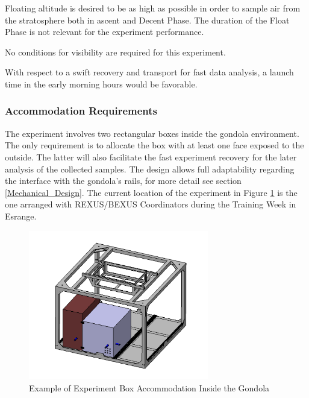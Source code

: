 Floating altitude is desired to be as high as possible in order to sample air from the stratosphere both in ascent and Decent Phase. The duration of the Float Phase is not relevant for the experiment performance. 

\smallskip
No conditions for visibility are required for this experiment.

\smallskip
With respect to a swift recovery and transport for fast data analysis, a launch time in the early morning hours would be favorable.

\pagebreak
\subsubsection{Accommodation Requirements}

The experiment involves two rectangular boxes inside the gondola environment. The only requirement is to allocate the box with at least one face exposed to the outside. The latter will also facilitate the fast experiment recovery for the later analysis of the collected samples. The design allows full adaptability regarding the interface with the gondola's rails, for more detail see section \ref{Mechanical_Design}. The current location of the experiment in Figure \ref{goldola_accommodation} is the one arranged with REXUS/BEXUS Coordinators during the Training Week in Esrange.

\begin{figure}[!ht]
    \centering
    \includegraphics[width=0.7\textwidth]{6-launch-campaign-preparation/img/gondola_overview_sample.png}
    \caption{Example of Experiment Box Accommodation Inside the Gondola}
    \label{goldola_accommodation}
\end{figure}